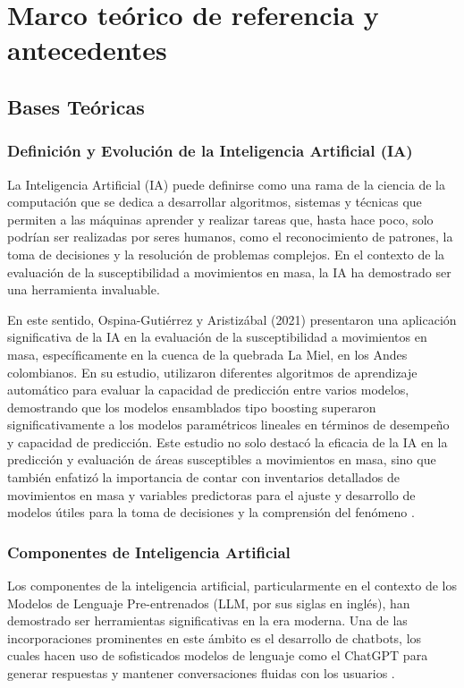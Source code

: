 \section{Marco teórico de referencia y antecedentes}
\label{sec:marco}

\subsection{Bases Teóricas}

\subsubsection{Definición y Evolución de la Inteligencia Artificial (IA)}
La Inteligencia Artificial (IA) puede definirse como una rama de la ciencia de la computación que se dedica a desarrollar algoritmos, sistemas y técnicas que permiten a las máquinas aprender y realizar tareas que, hasta hace poco, solo podrían ser realizadas por seres humanos, como el reconocimiento de patrones, la toma de decisiones y la resolución de problemas complejos. En el contexto de la evaluación de la susceptibilidad a movimientos en masa, la IA ha demostrado ser una herramienta invaluable.

En este sentido, Ospina-Gutiérrez y Aristizábal (2021) presentaron una aplicación significativa de la IA en la evaluación de la susceptibilidad a movimientos en masa, específicamente en la cuenca de la quebrada La Miel, en los Andes colombianos. En su estudio, utilizaron diferentes algoritmos de aprendizaje automático para evaluar la capacidad de predicción entre varios modelos, demostrando que los modelos ensamblados tipo boosting superaron significativamente a los modelos paramétricos lineales en términos de desempeño y capacidad de predicción. Este estudio no solo destacó la eficacia de la IA en la predicción y evaluación de áreas susceptibles a movimientos en masa, sino que también enfatizó la importancia de contar con inventarios detallados de movimientos en masa y variables predictoras para el ajuste y desarrollo de modelos útiles para la toma de decisiones y la comprensión del fenómeno \citep{Ospina2021AplicacionMasa}.

\subsubsection{Componentes de Inteligencia Artificial}
Los componentes de la inteligencia artificial, particularmente en el contexto de los Modelos de Lenguaje Pre-entrenados (LLM, por sus siglas en inglés), han demostrado ser herramientas significativas en la era moderna. Una de las incorporaciones prominentes en este ámbito es el desarrollo de chatbots, los cuales hacen uso de sofisticados modelos de lenguaje como el ChatGPT para generar respuestas y mantener conversaciones fluidas con los usuarios \citep{Zamfirescu-Pereira2023WhyPrompts}.

